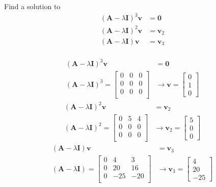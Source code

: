 \begin{itemize}
Find a solution to
\begin{align*}
(\mathbf{A}-\lambda \mathbf{I})^3 \mathbf{v}& = \mathbf{0} \\
(\mathbf{A}-\lambda \mathbf{I})^2 \mathbf{v}& = \mathbf{v}_2 \\
(\mathbf{A}-\lambda \mathbf{I}) \mathbf{v}& = \mathbf{v}_3 \\
\end{align*}

\begin{align*}
 (\mathbf{A}-\lambda \mathbf{I})^3 \mathbf{v}& = \mathbf{0} \\
 (\mathbf{A}-\lambda \mathbf{I})^3 = \begin{bmatrix}
  0 & 0 & 0\\
  0 & 0 & 0\\
  0 & 0 & 0\\
 \end{bmatrix}
&\rightarrow \mathbf{v}= \begin{bmatrix}
                            0\\1\\0
                           \end{bmatrix}
\end{align*}
\begin{align*}
 (\mathbf{A}-\lambda \mathbf{I})^2 \mathbf{v}& = \mathbf{v}_2 \\
 (\mathbf{A}-\lambda \mathbf{I})^2 = \begin{bmatrix}
  0 & 5 & 4\\
  0 & 0 & 0\\
  0 & 0 & 0\\
 \end{bmatrix}
&\rightarrow \mathbf{v}_2= \begin{bmatrix}
                            5\\0\\0
                           \end{bmatrix}
\end{align*}
\begin{align*}
 (\mathbf{A}-\lambda \mathbf{I}) \mathbf{v}& = \mathbf{v}_3 \\
 (\mathbf{A}-\lambda \mathbf{I}) = \begin{bmatrix}
  0 & 4 & 3\\
  0 & 20 &16\\
  0 & -25 & -20\\
 \end{bmatrix}
&\rightarrow \mathbf{v}_3= \begin{bmatrix}
                            4\\20\\-25
                           \end{bmatrix}
\end{align*}


\end{itemize}
